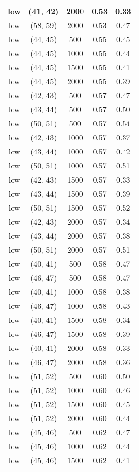 \begin{tabular}{c c c c c}
\textbf{low} & \textbf{(41, 42)} & \textbf{ 2000} & \textbf{0.53} & \textbf{0.33} \\
low & (58, 59) &  2000 & 0.53 & 0.47 \\
low & (44, 45) &  500 & 0.55 & 0.45 \\
low & (44, 45) &  1000 & 0.55 & 0.44 \\
low & (44, 45) &  1500 & 0.55 & 0.41 \\
low & (44, 45) &  2000 & 0.55 & 0.39 \\
low & (42, 43) &  500 & 0.57 & 0.47 \\
low & (43, 44) &  500 & 0.57 & 0.50 \\
low & (50, 51) &  500 & 0.57 & 0.54 \\
low & (42, 43) &  1000 & 0.57 & 0.37 \\
low & (43, 44) &  1000 & 0.57 & 0.42 \\
low & (50, 51) &  1000 & 0.57 & 0.51 \\
low & (42, 43) &  1500 & 0.57 & 0.33 \\
low & (43, 44) &  1500 & 0.57 & 0.39 \\
low & (50, 51) &  1500 & 0.57 & 0.52 \\
low & (42, 43) &  2000 & 0.57 & 0.34 \\
low & (43, 44) &  2000 & 0.57 & 0.38 \\
low & (50, 51) &  2000 & 0.57 & 0.51 \\
low & (40, 41) &  500 & 0.58 & 0.47 \\
low & (46, 47) &  500 & 0.58 & 0.47 \\
low & (40, 41) &  1000 & 0.58 & 0.38 \\
low & (46, 47) &  1000 & 0.58 & 0.43 \\
low & (40, 41) &  1500 & 0.58 & 0.34 \\
low & (46, 47) &  1500 & 0.58 & 0.39 \\
low & (40, 41) &  2000 & 0.58 & 0.33 \\
low & (46, 47) &  2000 & 0.58 & 0.36 \\
low & (51, 52) &  500 & 0.60 & 0.50 \\
low & (51, 52) &  1000 & 0.60 & 0.46 \\
low & (51, 52) &  1500 & 0.60 & 0.45 \\
low & (51, 52) &  2000 & 0.60 & 0.44 \\
low & (45, 46) &  500 & 0.62 & 0.47 \\
low & (45, 46) &  1000 & 0.62 & 0.44 \\
low & (45, 46) &  1500 & 0.62 & 0.41 \\

\end{tabular}
